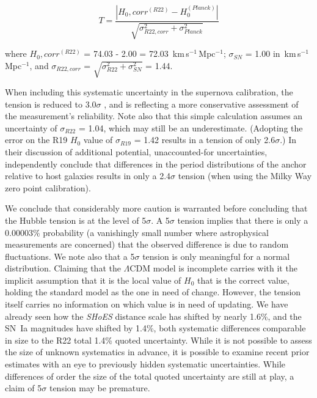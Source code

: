 \documentclass[12pt,modern]{aastex631}
\newcommand{\ho}{$H_{0}$\xspace}
\newcommand{\hounits}{\,km\,s$^{-1}$\,Mpc$^{-1}$\xspace}
\newcommand{\sn}{SN~Ia\xspace}
\newcommand{\shoes}{\emph{SHoES}\xspace}
\begin{document}
\[
T = \frac{\left| H_0,corr^{(R22)} - H_0^{(Planck)} \right|}{\sqrt{\sigma_{R22,corr}^2 + \sigma_{Planck}^2}}
\]



\noindent
where $H_0, corr^{(R22)}$ = 74.03 - 2.00 = 72.03 \hounits;  $\sigma_{SN}$ = 1.00 in \hounits, and $\sigma_{R22,corr}$ = $\sqrt{\sigma_{R22}^2+\sigma_{SN}^2}$ = 1.44. 




When including this systematic uncertainty in the supernova calibration, the tension is reduced to 3.0$\sigma$ , and is  reflecting a more  conservative assessment of the measurement's reliability. Note also that this simple calculation assumes an uncertainty of $\sigma_{R22}$ = 1.04, which may still be an underestimate. (Adopting the error on the R19 \ho value of $\sigma_{R19}$ = 1.42 results in a tension of only 2.6$\sigma$.) In their discussion of  additional potential, unaccounted-for uncertainties,  \citet{hogras_mortsell_2024}  independently conclude that differences in the period distributions of the anchor relative to host galaxies results in only a 2.4$\sigma$ tension (when using the Milky Way zero point calibration). 

We conclude that considerably more caution is warranted before concluding that the Hubble tension is at the level of 5$\sigma$. A 5$\sigma$ tension implies that there is only a 0.00003\% probability (a vanishingly small number where astrophysical measurements are concerned) that the observed difference is due to random fluctuations. We note also that a 5$\sigma$ tension is only meaningful for a normal distribution. Claiming that the $\Lambda$CDM model is incomplete carries with it the implicit assumption that it is the local value of \ho that is the correct value, holding the standard model as the one in need of change.  However, the tension itself carries no information on which value is in need of updating. We have already seen how the \shoes distance scale has shifted by nearly 1.6\%, and the \sn magnitudes have shifted by 1.4\%,  both systematic differences comparable in size to the R22 total 1.4\% quoted uncertainty. While it is not possible to assess the size of unknown systematics in advance, it is possible to examine recent prior estimates with an eye to previously hidden systematic uncertainties.  While differences of order the size of the total quoted uncertainty are still at play, 
a claim of 5$\sigma$ tension may be premature.  




\medskip\medskip\medskip\medskip\medskip\medskip\medskip\medskip\medskip\medskip
 
\end{document}
